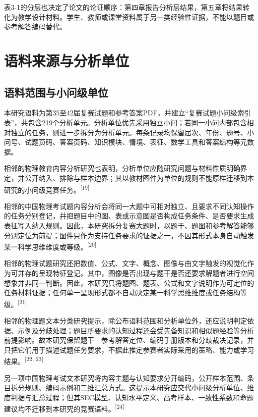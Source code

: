 \documentclass[
  12pt,
  a4paper]{ctexbook}
\begin{document}
表3-1的分层也决定了论文的论证顺序：第四章报告分析层结果，第五章将结果转化为教学设计材料。学生、教师或课堂资料属于另一类经验性证据，不能以题目或参考解答编码替代。

\section{语料来源与分析单位}\label{ux8bedux6599ux6765ux6e90ux4e0eux5206ux6790ux5355ux4f4d}

\subsection{语料范围与小问级单位}\label{ux8bedux6599ux8303ux56f4ux4e0eux5c0fux95eeux7ea7ux5355ux4f4d}

本研究语料为第35至42届复赛试题和参考答案PDF，并建立``复赛试题小问级索引表''，共包含219个分析单元。分析单位优先采用独立小问；若同一小问内部包含相对独立的任务，则进一步拆分为分析单元。每条记录均保留届次、年份、题号、小问号、试题页码、答案页码、知识模块、情境、表征、数学工具和答案结构等元数据。

相邻的物理教育内容分析研究也表明，分析单位应随研究问题与材料性质明确界定，并公开纳入、排除与样本边界；其以教材图件为单位的规则不能原样迁移到本研究的小问级竞赛任务。\textsuperscript{[19]}

相邻的中国物理考试题内容分析会将同一大题中可相对独立、且要求不同认知操作的任务分别登记，并把题目中的图、表或示意图是否构成任务条件、是否要求生成表征写入纳入规则。因此，本研究拆分复赛大题时，以题干、题图和参考解答能够分别定位为前提；图件只作为支持任务要求的证据之一，不因其形式本身自动触发某一科学思维维度或等级。\textsuperscript{[20]}

相邻的物理试题研究还把数值、公式、文字、概念、图像与由文字触发的视觉化作为可并存的呈现特征登记。其中，图像是否出现与题干是否还要求解题者进行空间想象并非同一判断。因此，本研究只将题图、题表、公式和文字说明作为可定位的任务材料证据；任何单一呈现形式都不自动决定某一科学思维维度或任务结构等级。\textsuperscript{[21]}

相邻的物理题文本分类研究提示，除公布语料范围和分析单位外，还应说明判定依据、示例及分歧处理；题目所要求的认知过程还会受先备知识和相似题经验等分析前提影响。故本研究保留题干---参考解答定位、编码手册版本和分歧裁决记录，并只把它们用于描述试题任务要求，不据此推定参赛者实际采用的策略、能力或学习结果。\textsuperscript{[22, 23]}

另一项中国物理考试文本研究将内容主题与认知要求分开编码，公开样本范围、条目拆分规则、编码示例和二维汇总方式。这提示本研究应交代小问级分析单位、维度判据与汇总过程；但其SEC模型、认知水平定义、高考样本、一致性系数和命题建议均不迁移到本研究的竞赛语料。\textsuperscript{[24]}
\end{document}
